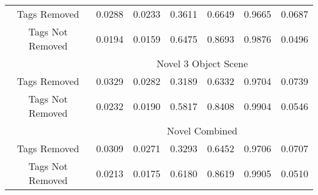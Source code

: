 \begin{table}[!t]
{\begin{tabular}{c|c|c|c|c|c|c}
    \rowcolor[HTML]{EFEFEF} 
	Tags Removed & 0.0288 & 0.0233 & 0.3611 & 0.6649 & 0.9665 & 0.0687 \\
	Tags Not Removed & 0.0194 & 0.0159 & 0.6475 & 0.8693 & 0.9876 & 0.0496\\
	\midrule
	\rowcolor[HTML]{FBE0CB}
	$\ $ &  \multicolumn{6}{c}{Novel 3 Object Scene} \\
	\rowcolor[HTML]{EFEFEF} 
	Tags Removed & 0.0329 & 0.0282 & 0.3189 & 0.6332 & 0.9704 & 0.0739\\
	
	Tags Not Removed & 0.0232 & 0.0190 & 0.5817 & 0.8408 & 0.9904 & 0.0546\\
	\midrule
	\rowcolor[HTML]{FBE0CB}
	$\ $ &  \multicolumn{6}{c}{Novel Combined} \\
	\midrule
	\rowcolor[HTML]{EFEFEF} 
	Tags Removed & 0.0309 & 0.0271 & 0.3293 & 0.6452 & 0.9706 & 0.0707\\
	Tags Not Removed & 0.0213 & 0.0175 & 0.6180 & 0.8619 & 0.9905 & 0.0510\\
	\bottomrule
\end{tabular}
}
\label{tab:tags_removed}
\end{table}

